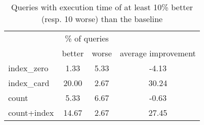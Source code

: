 \documentclass[preview]{standalone}
\begin{document}
 
\begin{table}[!ht] 
\centering 
\begin{tabular}{lccc} 
& \multicolumn{2}{c}{\% of queries} \\\cline{2-3}& better & worse & average improvement \\ \hline 
index\_zero & 1.33 & 5.33 & -4.13 \\ 
 index\_card & 20.00 & 2.67 & 30.24 \\ 
 count & 5.33 & 6.67 & -0.63 \\ 
 count+index & 14.67 & 2.67 & 27.45 \\ 
 \end{tabular} 
\caption{Queries with execution time of at least 10\% better (resp. 10 worse) than the baseline}
\end{table} 
\end{document}
